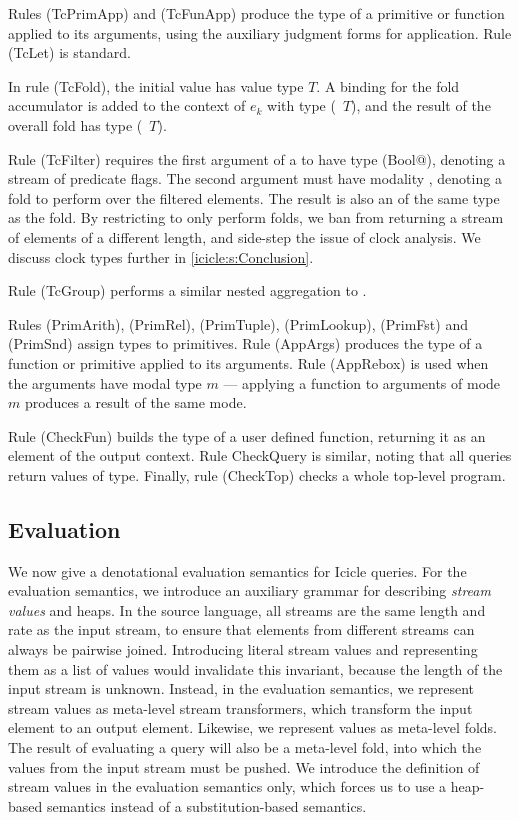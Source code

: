 Rules (TcPrimApp) and (TcFunApp) produce the type of a primitive or function applied to its arguments, using the auxiliary judgment forms for application.
Rule (TcLet) is standard.

In rule (TcFold), the initial value has value type $T$.
A binding for the fold accumulator is added to the context of $e_k$ with type (\Ic@Element@~$T$), and the result of the overall fold has type (\Ic@Aggregate@~$T$).

Rule (TcFilter) requires the first argument of a \Ic@filter@ to have type (\Ic@Element Bool@), denoting a stream of predicate flags.
The second argument must have modality \Ic@Aggregate@, denoting a fold to perform over the filtered elements.
The result is also an \Ic@Aggregate@ of the same type as the fold.
By restricting \Ic@filter@ to only perform folds, we ban \Ic@filter@ from returning a stream of elements of a different length, and side-step the issue of clock analysis.
We discuss clock types further in \cref{icicle:s:Conclusion}.

Rule (TcGroup) performs a similar nested aggregation to \Ic@filter@.

Rules (PrimArith), (PrimRel), (PrimTuple), (PrimLookup), (PrimFst) and (PrimSnd) assign types to primitives.
Rule (AppArgs) produces the type of a function or primitive applied to its arguments.
Rule (AppRebox) is used when the arguments have modal type $m$ --- applying a function to arguments of mode $m$ produces a result of the same mode.

Rule (CheckFun) builds the type of a user defined function, returning it as an element of the output context. Rule CheckQuery is similar, noting that all queries return values of \Ic@Aggregate@ type. Finally, rule (CheckTop) checks a whole top-level program.


\subsection{Evaluation}

We now give a denotational evaluation semantics for Icicle queries.
For the evaluation semantics, we introduce an auxiliary grammar for describing \emph{stream values} and heaps.
In the source language, all streams are the same length and rate as the input stream, to ensure that elements from different streams can always be pairwise joined.
Introducing literal stream values and representing them as a list of values would invalidate this invariant, because the length of the input stream is unknown.
Instead, in the evaluation semantics, we represent \Ic@Element@ stream values as meta-level stream transformers, which transform the input element to an output element.
Likewise, we represent \Ic@Aggregate@ values as meta-level folds.
The result of evaluating a query will also be a meta-level fold, into which the values from the input stream must be pushed.
We introduce the definition of stream values in the evaluation semantics only, which forces us to use a heap-based semantics instead of a substitution-based semantics.


